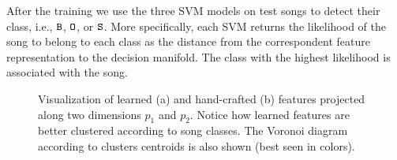 After the training we  use the three SVM models on test songs to detect their class, i.e., $\B$, $\O$, or $\S$. More specifically, each SVM returns the likelihood of the song to belong to each class as the distance from the correspondent feature representation to the decision manifold. The class with the highest likelihood is associated with the song. 

\begin{figure}[tbp]
\centering
{} \hfil
\centering
{} \hfil
\caption{Visualization of learned (a) and hand-crafted (b) features projected along two dimensions $p_1$ and $p_2$. Notice how learned features are better clustered according to song classes. The Voronoi diagram according to clusters centroids is also shown (best seen in colors).}
\label{fig:Bootleg:clusters}
\end{figure}

